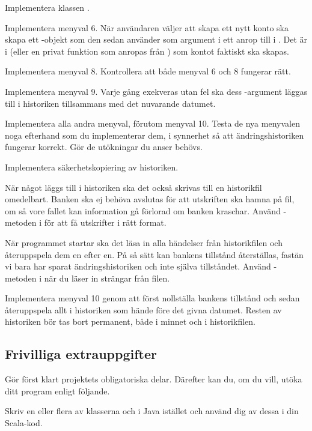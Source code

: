 \Task Implementera klassen .

\Subtask Implementera menyval 6. När användaren väljer att skapa ett nytt konto ska  skapa ett -objekt som den sedan använder som argument i ett anrop till  i . Det är i  (eller en privat funktion som anropas från ) som kontot faktiskt ska skapas.

\Subtask Implementera menyval 8. Kontrollera att både menyval 6 och 8 fungerar rätt.

\Subtask Implementera menyval 9. Varje gång  exekveras utan fel ska dess -argument läggas till i historiken tillsammans med det nuvarande datumet.

\Subtask Implementera alla andra menyval, förutom menyval 10. Testa de nya menyvalen noga efterhand som du implementerar dem, i synnerhet så att ändringshistoriken fungerar korrekt. Gör de utökningar du anser behövs.

\Task Implementera säkerhetskopiering av historiken.

\Subtask När något läggs till i historiken ska det också skrivas till en historikfil omedelbart. Banken ska ej behöva avslutas för att utskriften ska hamna på fil, om så vore fallet kan information gå förlorad om banken kraschar. Använd -metoden i  för att få utskrifter i rätt format.

\Subtask När programmet startar ska det läsa in alla händelser från historikfilen och återuppspela dem en efter en. På så sätt kan bankens tillstånd återställas, fastän vi bara har sparat ändringshistoriken och inte själva tillståndet. Använd -metoden i  när du läser in strängar från filen.

\Task Implementera menyval 10 genom att först nollställa bankens tillstånd och sedan återuppspela allt i historiken som hände före det givna datumet. Resten av historiken bör tas bort permanent, både i minnet och i historikfilen.


\subsection{Frivilliga extrauppgifter}

Gör först klart projektets obligatoriska delar. Därefter kan du, om du vill, utöka ditt program enligt följande.

\Task Skriv en eller flera av klasserna  och  i Java istället och använd dig av dessa i din Scala-kod.

